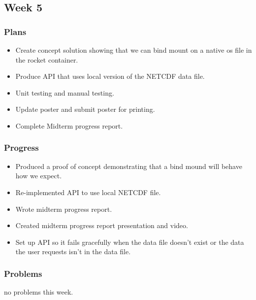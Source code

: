 \documentclass[onecolumn, draftclsnofoot,10pt, compsoc]{article}
\begin{document}
		\subsection{Week 5}
			\subsubsection{Plans}
			    \begin{itemize}
			        \item Create concept solution showing that we can bind mount on a native os file in the rocket container. 
			        \item Produce API that uses local version of the NETCDF data file.\\
			        \item Unit testing and manual testing.\\
			        \item Update poster and submit poster for printing.\\
			        \item Complete Midterm progress report.\\
			    \end{itemize}
			\subsubsection{Progress}
			    \begin{itemize}
			        \item Produced a proof of concept demonstrating that a bind mound will behave how we expect.\\
			        \item Re-implemented API to use local NETCDF file.\\
			        \item Wrote midterm progress report.\\
			        \item Created midterm progress report presentation and video.\\
			        \item Set up API so it fails gracefully when the data file doesn't exist or the data the user requests isn't in the data file.\\
			    \end{itemize}
			\subsubsection{Problems}
			no problems this week.\\
\end{document}
